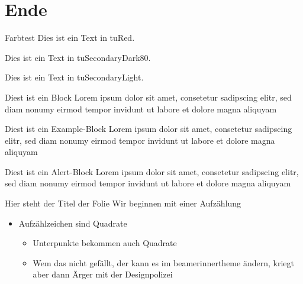 \documentclass[fleqn,10pt,t,tocinheader,widetoc,blue]{beamer}
\begin{document}
\section{Ende}

\begin{frame}{Farbtest}
  \color{tuRed}
  Dies ist ein Text in tuRed.

  \color{tuSecondaryDark80}
  Dies ist ein Text in tuSecondaryDark80.

  \color{tuSecondaryLight}
  Dies ist ein Text in tuSecondaryLight.

  \begin{block}{Diest ist ein Block}
    Lorem ipsum dolor sit amet, consetetur sadipscing elitr, sed diam
    nonumy eirmod tempor invidunt ut labore et dolore magna aliquyam
  \end{block}
  
  \begin{exampleblock}{Diest ist ein Example-Block}
    Lorem ipsum dolor sit amet, consetetur sadipscing elitr, sed diam
    nonumy eirmod tempor invidunt ut labore et dolore magna aliquyam
  \end{exampleblock}

  \begin{alertblock}{Diest ist ein Alert-Block}
    Lorem ipsum dolor sit amet, consetetur sadipscing elitr, sed diam
    nonumy eirmod tempor invidunt ut labore et dolore magna aliquyam
  \end{alertblock}
\end{frame}

\begin{frame}{Hier steht der Titel der Folie}
Wir beginnen mit einer Aufzählung
\begin{itemize}
\item Aufzählzeichen sind Quadrate
\begin{itemize}
\item Unterpunkte bekommen auch Quadrate
\item Wem das nicht gefällt, der kann es im beamerinnertheme ändern,
  kriegt aber dann Ärger mit der Designpolizei
\end{itemize}
\end{itemize}

\end{frame}
\end{document}
